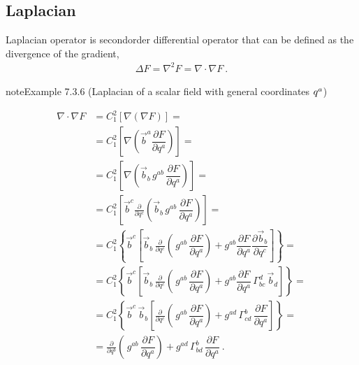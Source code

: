 \documentclass[letterpaper,10pt,english]{jupyterBook}
\begin{document}
\subsection{Laplacian}
\label{\detokenize{ch/tensor-algebra-calculus/calculus-euclidean:laplacian}}\label{\detokenize{ch/tensor-algebra-calculus/calculus-euclidean:tensor-calculus-differential-operators-laplacian}}
\sphinxAtStartPar
Laplacian operator is second\sphinxhyphen{}order differential operator that can be defined as the divergence of the gradient,
\begin{equation*}
\begin{split}\Delta F = \nabla^2 F = \nabla \cdot \nabla F \ .\end{split}
\end{equation*}\label{ch/tensor-algebra-calculus/calculus-euclidean:example-9}
\begin{sphinxadmonition}{note}{Example 7.3.6 (Laplacian of a scalar field \sphinxhyphen{} with general coordinates \protect\(q^a\protect\))}


\begin{equation*}
\begin{split}
\nabla \cdot \nabla F
  & = C_{1}^2 \left[ \nabla \left( \nabla F \right) \right] = \\
  & = C_{1}^2 \left[ \nabla \left( \vec{b}^a \dfrac{\partial F}{\partial q^a} \right) \right] = \\
  & = C_{1}^2 \left[ \nabla \left( \vec{b}_b \, g^{ab} \, \dfrac{\partial F}{\partial q^a} \right) \right] = \\
  & = C_{1}^2 \left[ \vec{b}^c \frac{\partial}{\partial q^c} \left( \vec{b}_b \, g^{ab} \, \dfrac{\partial F}{\partial q^a} \right) \right] = \\
  & = C_{1}^2 \left\{ \vec{b}^c \left[ \vec{b}_b \, \frac{\partial}{\partial q^c} \left( \, g^{ab} \, \dfrac{\partial F}{\partial q^a} \right) + g^{ab} \dfrac{\partial F}{\partial q^a} \dfrac{\partial \vec{b}_b}{\partial q^c} \right] \right\} = \\
  & = C_{1}^2 \left\{ \vec{b}^c \left[ \vec{b}_b \, \frac{\partial}{\partial q^c} \left( \, g^{ab} \, \dfrac{\partial F}{\partial q^a} \right) + g^{ab} \dfrac{\partial F}{\partial q^a} \, \Gamma_{bc}^d \, \vec{b}_d \right] \right \} = \\
  & = C_{1}^2 \left\{ \vec{b}^c \, \vec{b}_b \left[ \frac{\partial}{\partial q^c} \left( \, g^{ab} \, \dfrac{\partial F}{\partial q^a} \right) + g^{ad} \, \Gamma_{cd}^b \, \dfrac{\partial F}{\partial q^a} \right] \right \} = \\
  & = \frac{\partial}{\partial q^b} \left( \, g^{ab} \, \dfrac{\partial F}{\partial q^a} \right) + g^{ad} \, \Gamma_{bd}^b \, \dfrac{\partial F}{\partial q^a} \ .
\end{split}
\end{equation*}\end{sphinxadmonition}
\end{document}
